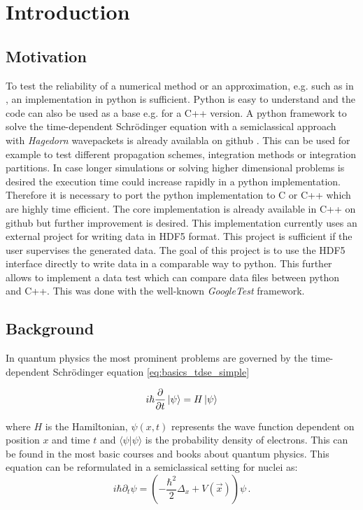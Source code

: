 \chapter{Introduction}

\section{Motivation}
To test the reliability of a numerical method or an approximation, e.g. such as in \cite{B_bachelor_thesis}, an implementation in python is sufficient. Python is easy to understand and the code can also be used as a base e.g. for a C++ version. A python framework to solve the time-dependent Schr\"odinger equation with a semiclassical approach with \textit{Hagedorn} wavepackets is already availabla on github \cite{waveblocksnd}. This can be used for example to test different propagation schemes, integration methods or integration partitions. In case longer simulations or solving higher dimensional problems is desired the execution time could increase rapidly in a python implementation. Therefore it is necessary to port the python implementation to C or C++ which are highly time efficient. The core implementation is already available in C++ on github \cite{libwaveblocks} but further improvement is desired. This implementation currently uses an external project \cite{eigen3-hdf5} for writing data in HDF5 format. This project is sufficient if the user supervises the generated data. The goal of this project is to use the HDF5 interface \cite{hdf5cppdoc} directly to write data in a comparable way to python. This further allows to implement a data test which can compare data files between python and C++. This was done with the well-known \textit{GoogleTest} \cite{googletest} framework.

\section{Background}
\label{seq:background}

In quantum physics the most prominent problems are governed by the time-dependent
Schr\"odinger equation \ref{eq:basics_tdse_simple}

\begin{equation} \label{eq:basics_tdse_simple}
  i \hbar \frac{\partial}{\partial t} \Ket{\psi} = H \Ket{\psi}
\end{equation}

where $H$ is the Hamiltonian, $\psi(x,t)$ represents the wave function dependent on position $x$ and
time $t$ and $\langle \psi | \psi  \rangle$ is the probability density of electrons. This can be found in the most basic courses and books about quantum physics. This equation can be reformulated in a semiclassical setting for nuclei as: \
\begin{equation}
\label{eq:tdse_sc_nuclei}
 i\hbar \partial_{t}\psi = \left( -\frac{\hbar^{2}}{2} \Delta_{x} + V(\vec{x}) \right) \psi\,.
\end{equation}

